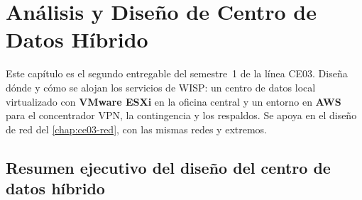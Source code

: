 \chapter{Análisis y Diseño de Centro de Datos Híbrido}
\label{chap:ce03-dc}



Este capítulo es el segundo entregable del semestre~1 de la línea CE03. Diseña dónde
y cómo se alojan los servicios de WISP: un centro de datos local virtualizado con
\textbf{VMware ESXi} en la oficina central y un entorno en \textbf{AWS} para el
concentrador VPN, la contingencia y los respaldos. Se apoya en el diseño de red del
\cref{chap:ce03-red}, con las mismas redes y extremos.

\section{Resumen ejecutivo del diseño del centro de datos híbrido}

